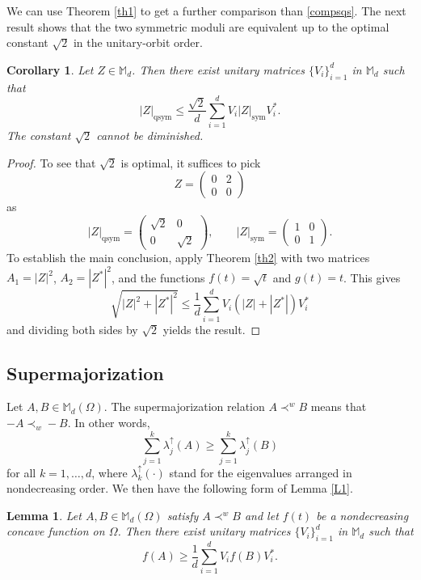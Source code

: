 \documentclass[12pt,reqno]{article}
\newtheorem{lemma}[theorem]{Lemma}
\newtheorem{cor}[theorem]{Corollary}
\theoremstyle{definition}
\theoremstyle{remark}
\numberwithin{equation}{section}
\def\bM{\mathbb{M}}
\newcommand{\sym}{\mathrm{sym}}
\newcommand{\qsym}{\mathrm{qsym}}
\begin{document}
\vskip 5pt 
We can use Theorem \ref{th1} to get a  further comparison than \eqref{compsqs}.
The next result shows that the two symmetric moduli are equivalent up to the optimal constant 
$\sqrt{2}$ 
 in the unitary-orbit order.



\vskip 5pt
\begin{cor} Let $Z\in \bM_d$. Then there exist unitary matrices $\{V_i\}_{i=1}^d$  in $\bM_d$ such that 
$$
|Z|_{\qsym} \le \frac{ \sqrt{2}}{d}  \sum_{i=1}^d V_i |Z|_{\sym}V_i^*.
$$
The constant $\sqrt{2}$ cannot be diminished.
\end{cor}

\vskip 5pt
\begin{proof} To see that $\sqrt{2}$ is optimal, it suffices to pick
$$
Z=\begin{pmatrix} 0&2 \\ 0&0\end{pmatrix}
$$
as
$$
|Z|_{\qsym} =  \begin{pmatrix} \sqrt{2}&0 \\ 0&\sqrt{2}\end{pmatrix}, \qquad |Z|_{\sym} =  \begin{pmatrix} 1&0 \\ 0&1\end{pmatrix}.
$$
To establish the main conclusion, apply Theorem \ref{th2} with two matrices $A_1=|Z|^2$, $A_2=|Z^*|^2$, and the functions $f(t)=\sqrt{t}$ and $g(t)=t$. This gives
$$
\sqrt{|Z|^2+|Z^*|^2} \le \frac{ 1}{d}  \sum_{i=1}^d V_i \left(|Z|+|Z^*|\right)V_i^*
$$
and dividing both sides by $\sqrt{2}$ yields the result.
\end{proof}


\subsection{Supermajorization}

Let $A,B\in\bM_d(\Omega)$. The supermajorization relation $A\prec ^{w} B$ means that $-A\prec_w -B$. In other words,
$$
\sum_{j=1}^k\lambda_j^{\uparrow}(A) \ge  \sum_{j=1}^k\lambda_j^{\uparrow}(B)
$$
for all $k=1,\ldots, d$, where $\lambda_k^{\uparrow}(\cdot)$ stand for the eigenvalues arranged in nondecreasing order. We then have the following form of Lemma \ref{L1}.

\vskip 5pt
\begin{lemma}\label{L2} Let $A,B\in\bM_d(\Omega)$ satisfy $A\prec^w B$ and let $f(t)$ be a nondecreasing concave function on $\Omega$. Then 
there exist unitary matrices $\{V_i\}_{i=1}^d$  in $\bM_d$ such that 
$$
f(A)\ge \frac{1}{d}\sum_{i=1}^d V_i f(B)V_i^*.
$$
\end{lemma}
\end{document}
